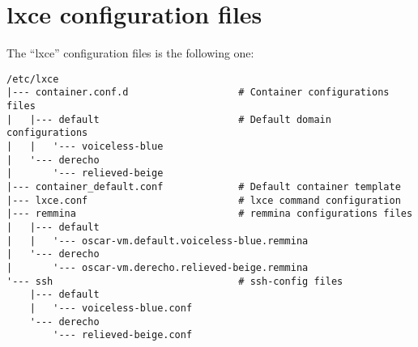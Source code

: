 \newpage\section{lxce configuration files}\label{annex:conf}

The ``lxce'' configuration files is the following one:
\begin{verbatim}
/etc/lxce 
|--- container.conf.d                   # Container configurations files
|   |--- default                        # Default domain configurations
|   |   '--- voiceless-blue
|   '--- derecho 			
|       '--- relieved-beige
|--- container_default.conf             # Default container template	
|--- lxce.conf                          # lxce command configuration
|--- remmina                            # remmina configurations files
|   |--- default 
|   |   '--- oscar-vm.default.voiceless-blue.remmina
|   '--- derecho 
|       '--- oscar-vm.derecho.relieved-beige.remmina
'--- ssh                                # ssh-config files
    |--- default 
    |   '--- voiceless-blue.conf
    '--- derecho
        '--- relieved-beige.conf
\end{verbatim}


